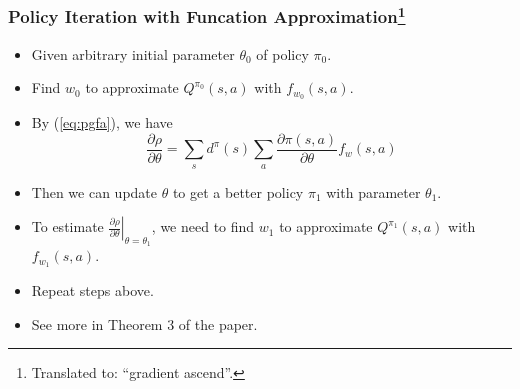 \begin{frame}
    \frametitle{Policy Iteration with Funcation Approximation\footnote{Translated to: ``gradient ascend''.}}
    \begin{itemize}
    \item Given arbitrary initial parameter $\theta_0$ of policy $\pi_0$.
    \item Find $w_0$ to approximate $Q^{\pi_0}(s, a)$ with $f_{w_0}(s, a)$.
    \item By (\ref{eq:pgfa}), we have
      \begin{equation*}
        \frac{\partial \rho}{\partial \theta} = \sum_s d^\pi (s) \sum_a \frac{\partial \pi(s, a)}{\partial \theta} f_w(s, a)
      \end{equation*}
    \item Then we can update $\theta$ to get a better policy $\pi_1$ with parameter $\theta_1$.
    \item To estimate $\left. \frac{\partial \rho}{\partial \theta} \right|_{\theta = \theta_1}$, we need to find $w_1$ to approximate $Q^{\pi_1}(s, a)$ with $f_{w_1}(s, a)$.
    \item Repeat steps above.
    \item See more in Theorem 3 of the paper.
    \end{itemize}
\end{frame}